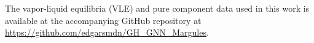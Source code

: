 The vapor-liquid equilibria (VLE) and pure component data used in this work is available at the accompanying GitHub repository at \url{https://github.com/edgarsmdn/GH_GNN_Margules}.